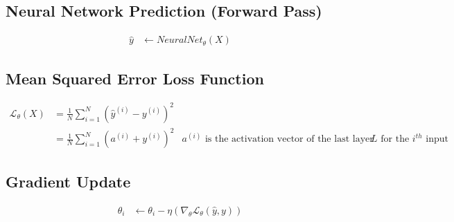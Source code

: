 \documentclass{article}
\begin{document}
\subsection{Neural Network Prediction (Forward Pass)}
\begin{align}
	\hat{y} & \gets NeuralNet_\theta(X)
\end{align}

\subsection{Mean Squared Error Loss Function}
\begin{equation}
	\begin{aligned}
		\mathcal{L}_\theta(X) & =
		\frac{1}{N} \sum_{i=1}^{N}{ (\hat{y}^{(i)} - y^{(i)} )^{2}}                                                                                                            \\
		                      & = \frac{1}{N} \sum_{i=1}^{N}{(a^{(i)} + y^{(i)})^{2}} & \text{$a^{(i)}$ is the activation vector of the last layer $L$ for the $i^{th}$ input}
	\end{aligned}
\end{equation}

\subsection{Gradient Update}
\begin{align}
	\theta_i & \gets \theta_i - \eta (\nabla_\theta \mathcal{L}_{\theta}(\hat{y}, y))
\end{align}
\end{document}
